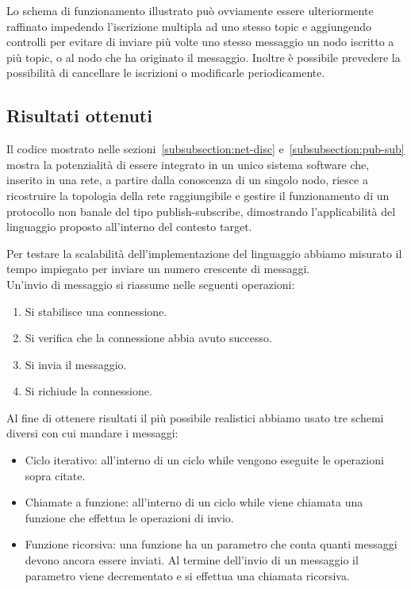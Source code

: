 \documentclass[10pt]{article}
\begin{document}
Lo schema di funzionamento illustrato può ovviamente essere ulteriormente raffinato impedendo l'iscrizione multipla ad uno stesso topic e aggiungendo controlli per evitare di inviare più volte uno stesso messaggio un nodo iscritto a più topic, o al nodo che ha originato il messaggio. Inoltre è possibile prevedere la possibilità di cancellare le iscrizioni o modificarle periodicamente.

\subsection{Risultati ottenuti}\label{subsection:risultati}

Il codice mostrato nelle sezioni~\ref{subsubsection:net-disc} e~\ref{subsubsection:pub-sub} mostra la potenzialità di essere integrato in un unico sistema software che, inserito in una rete, a partire dalla conoscenza di un singolo nodo, riesce a ricostruire la topologia della rete raggiungibile e gestire il funzionamento di un protocollo non banale del tipo publish-subscribe, dimostrando l'applicabilità del linguaggio proposto all'interno del contesto target. 

Per testare la scalabilità dell'implementazione del linguaggio abbiamo misurato il tempo impiegato per inviare un numero crescente di messaggi.\\
Un'invio di messaggio si riassume nelle seguenti operazioni:
\begin{enumerate}
	\item Si stabilisce una connessione.
	\item{Si verifica che la connessione abbia avuto successo.}
	\item Si invia il messaggio. 
	\item Si richiude la connessione.
\end{enumerate}

Al fine di ottenere risultati il più possibile realistici abbiamo usato tre schemi diversi con cui mandare i messaggi:
\begin{itemize}
	\item Ciclo iterativo: all'interno di un ciclo while vengono eseguite le operazioni sopra citate.
	\item Chiamate a funzione: all'interno di un ciclo while viene chiamata una funzione che effettua le operazioni di invio.
	\item Funzione ricorsiva: una funzione ha un parametro che conta quanti messaggi devono ancora essere inviati. Al termine dell'invio di un messaggio il parametro viene decrementato e si effettua una chiamata ricorsiva.
\end{itemize}
\end{document}
